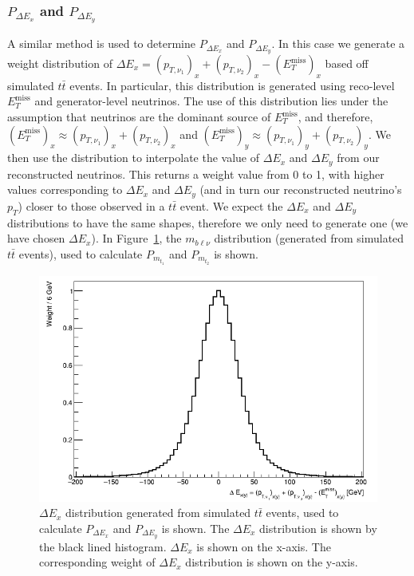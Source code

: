 \subsubsection{$P_{\Delta E_{x}}$ and $P_{\Delta E_{y}}$}
A similar method is used to determine $P_{\Delta E_{x}}$ and $P_{\Delta E_{y}}$. In this case we generate a weight distribution of $\Delta E_{x} = (p_{T,\nu_{1}})_{x} + (p_{T,\nu_{2}})_{x} - (E_{T}^{\text{miss}})_{x}$ based off simulated $t\bar{t}$ events. In particular, this distribution is generated using reco-level $E_{T}^{\text{miss}}$ and generator-level neutrinos. The use of this distribution lies under the assumption that neutrinos are the dominant source of $E_{T}^{\text{miss}}$, and therefore, $(E_{T}^{\text{miss}})_{x} \approx (p_{T,\nu_{1}})_{x} + (p_{T,\nu_{2}})_{x}$ and $(E_{T}^{\text{miss}})_{y} \approx (p_{T,\nu_{1}})_{y} + (p_{T,\nu_{2}})_{y}$. We then use the distribution to interpolate the value of $\Delta E_{x}$ and $\Delta E_{y}$ from our reconstructed neutrinos. This returns a weight value from 0 to 1, with higher values corresponding to $\Delta E_{x}$ and $\Delta E_{y}$ (and in turn our reconstructed neutrino's $p_{T}$) closer to those observed in a $t\bar{t}$ event. We expect the $\Delta E_{x}$ and $\Delta E_{y}$ distributions to have the same shapes, therefore we only need to generate one (we have chosen $\Delta E_{x}$). 
In Figure~\ref{fig:2vSM-deltaE-dist}, the $m_{b\ell\nu}$ distribution (generated from simulated $t\bar{t}$ events), used to calculate $P_{m_{t_{1}}}$ and $P_{m_{t_{2}}}$ is shown.

\begin{figure}[h!]
	\includegraphics[width=0.6\linewidth]{figures/dExy_2vSM.png}
	\centering
	\caption{$\Delta E_{x}$ distribution generated from simulated $t\bar{t}$ events, used to calculate $P_{\Delta E_{x}}$ and $P_{\Delta E_{y}}$ is shown. The $\Delta E_{x}$ distribution is shown by the black lined histogram. $\Delta E_{x}$ is shown on the x-axis. The corresponding weight of $\Delta E_{x}$ distribution is shown on the y-axis. }
	\label{fig:2vSM-deltaE-dist}
\end{figure}

